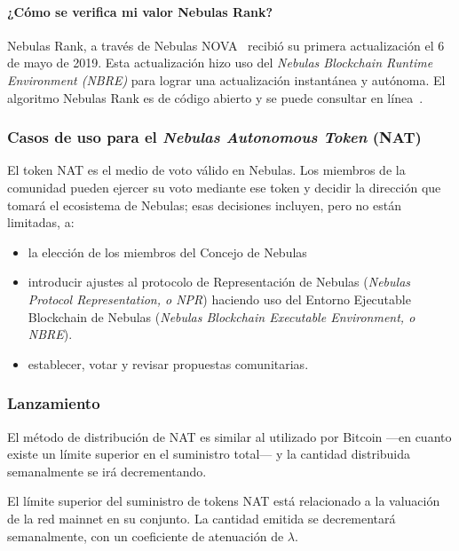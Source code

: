 \begin{center}
{\begin{minipage}[c]{.8\textwidth}
		\paragraph{¿Cómo se verifica mi valor Nebulas Rank?}

		Nebulas Rank, a través de Nebulas NOVA~\cite{nova} recibió su primera actualización el 6 de mayo de 2019. Esta actualización hizo uso del \textit{Nebulas Blockchain Runtime Environment (NBRE)} para lograr una actualización instantánea y autónoma. El algoritmo Nebulas Rank es de código abierto y se puede consultar en línea~\cite{CheckNR}.

	\end{minipage}}
\end{center}

\subsubsection{Casos de uso para el \textit{Nebulas Autonomous Token} (NAT)}

El token NAT es el medio de voto válido en Nebulas. Los miembros de la comunidad pueden ejercer su voto \onchain mediante ese token y decidir la dirección que tomará el ecosistema de Nebulas; esas decisiones incluyen, pero no están limitadas, a:

\begin{itemize}
	\item la elección de los miembros del Concejo de Nebulas
	\item introducir ajustes al protocolo de Representación de Nebulas (\textit{Nebulas Protocol Representation, o NPR}) haciendo uso del Entorno Ejecutable Blockchain de Nebulas (\textit{Nebulas Blockchain Executable Environment, o NBRE}).
	\item establecer, votar y revisar propuestas comunitarias.
\end{itemize}

\subsubsection{Lanzamiento}

El método de distribución de NAT es similar al utilizado por Bitcoin —en cuanto existe un límite superior en el suministro total— y la cantidad distribuida semanalmente se irá decrementando.

El límite superior del suministro de tokens NAT está relacionado a la valuación \nr de la red mainnet en su conjunto. La cantidad emitida se decrementará semanalmente, con un coeficiente de atenuación de $\lambda$.

